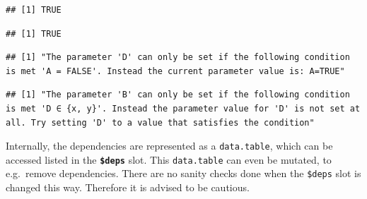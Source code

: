 \documentclass[]{scrbook}
\newenvironment{Shaded}{\begin{snugshade}}{\end{snugshade}}
\newcommand{\CommentTok}[1]{\textcolor[rgb]{0.56,0.35,0.01}{\textit{#1}}}
\newcommand{\DataTypeTok}[1]{\textcolor[rgb]{0.13,0.29,0.53}{#1}}
\newcommand{\DecValTok}[1]{\textcolor[rgb]{0.00,0.00,0.81}{#1}}
\newcommand{\KeywordTok}[1]{\textcolor[rgb]{0.13,0.29,0.53}{\textbf{#1}}}
\newcommand{\NormalTok}[1]{#1}
\newcommand{\OperatorTok}[1]{\textcolor[rgb]{0.81,0.36,0.00}{\textbf{#1}}}
\newcommand{\OtherTok}[1]{\textcolor[rgb]{0.56,0.35,0.01}{#1}}
\newcommand{\StringTok}[1]{\textcolor[rgb]{0.31,0.60,0.02}{#1}}
\renewenvironment{Shaded} {\begin{snugshade}\small} {\end{snugshade}}
\begin{document}
\begin{verbatim}
## [1] TRUE
\end{verbatim}

\begin{Shaded}
\end{Shaded}

\begin{verbatim}
## [1] TRUE
\end{verbatim}

\begin{Shaded}
\end{Shaded}

\begin{verbatim}
## [1] "The parameter 'D' can only be set if the following condition is met 'A = FALSE'. Instead the current parameter value is: A=TRUE"
\end{verbatim}

\begin{Shaded}
\end{Shaded}

\begin{verbatim}
## [1] "The parameter 'B' can only be set if the following condition is met 'D ∈ {x, y}'. Instead the parameter value for 'D' is not set at all. Try setting 'D' to a value that satisfies the condition"
\end{verbatim}

Internally, the dependencies are represented as a \texttt{data.table}, which can be accessed listed in the \textbf{\texttt{\$deps}} slot.
This \texttt{data.table} can even be mutated, to e.g.~remove dependencies.
There are no sanity checks done when the \texttt{\$deps} slot is changed this way.
Therefore it is advised to be cautious.
\end{document}
